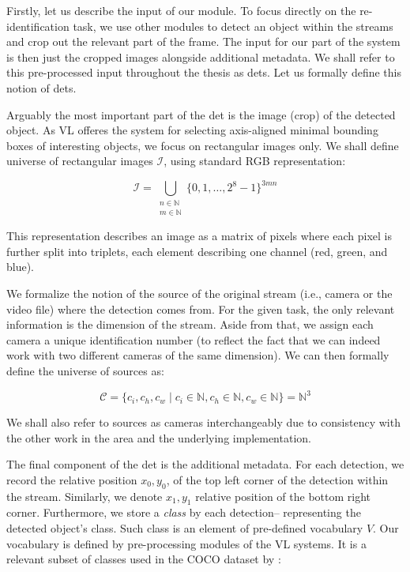 \label{ssec:input}

Firstly, let us describe the input of our module. To focus directly on the re-identification task, we use other modules to detect an object within the streams and crop out the relevant part of the frame. The input for our part of the system is then just the cropped images alongside additional metadata. We shall refer to this pre-processed input throughout the thesis as \glspl{det}. Let us formally define this notion of \glspl{det}.

Arguably the most important part of the \gls{det} is the image (crop) of the detected object. As \gls{VL} offeres the system for selecting axis-aligned minimal bounding boxes of interesting objects, we focus on rectangular images only. We shall define universe of rectangular images $\mathcal{I}$, using standard RGB representation:

\begin{equation}
\mathcal{I} = \bigcup_{\substack{n \in \mathbb{N} \\ m \in \mathbb{N}}} \{0, 1, \ldots, 2^8-1\}^{3mn}
\label{eq:image}
\end{equation}


This representation describes an image as a matrix of pixels where each pixel is further split into triplets, each element describing one channel (red, green, and blue).

We formalize the notion of the source of the original stream (i.e., camera or the video file) where the detection comes from. For the given task, the only relevant information is the dimension of the stream. Aside from that, we assign each camera a unique identification number (to reflect the fact that we can indeed work with two different cameras of the same dimension). We can then formally define the universe of sources as:

$$\mathcal{C} = \{c_i, c_h, c_w \mid c_i \in \mathbb{N}, c_h \in \mathbb{N}, c_w \in \mathbb{N}\}
 = \mathbb{N}^3$$
 
We shall also refer to sources as cameras interchangeably due to consistency with the other work in the area and the underlying implementation.

The final component of the \gls{det} is the additional metadata. For each detection, we record the relative position $x_0, y_0$, of the top left corner of the detection within the stream. Similarly, we denote $x_1, y_1$ relative position of the bottom right corner. Furthermore, we store a \emph{class} by each detection-- representing the detected object's class. Such class is an element of pre-defined vocabulary $V$. Our vocabulary is defined by pre-processing modules of the \gls{VL} systems. It is a relevant subset of classes used in the COCO dataset by \cite{cocodataset}:

